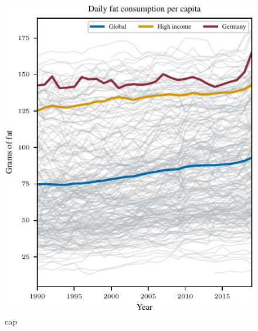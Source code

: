 \begin{figure}[ht]
\vskip 0.2in
\begin{center}
\centerline{\includegraphics[width=\columnwidth]{fig/fig_FatConsumptionPerCapita.pdf}}
\caption{cap}
\label{FatConsumptionPerCapita}
\end{center}
\vskip -0.2in
\end{figure}

